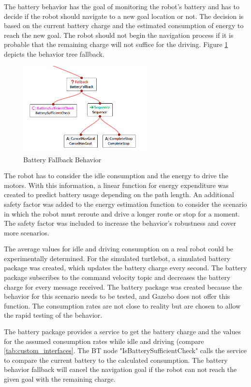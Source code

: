 The battery behavior has the goal of monitoring the robot's battery and has to decide if the robot should navigate to a new goal location or not. The decision is based on the current battery charge and the estimated consumption of energy to reach the new goal. The robot should not begin the navigation process if it is probable that the remaining charge will not suffice for the driving. Figure \ref{fig:battery_fallback} depicts the behavior tree fallback.

\begin{figure}[ht]
	\centering
	\includegraphics[width=0.6\textwidth]{images/battery_fallback_inverted.png}
	\caption{Battery Fallback Behavior}
	\label{fig:battery_fallback}
\end{figure}

The robot has to consider the idle consumption and the energy to drive the motors. With this information, a linear function for energy expenditure was created to predict battery usage depending on the path length. An additional safety factor was added to the energy estimation function to consider the scenario in which the robot must reroute and drive a longer route or stop for a moment. The safety factor was included to increase the behavior's robustness and cover more scenarios.
%

The average values for idle and driving consumption on a real robot could be experimentally determined. For the simulated turtlebot, a simulated battery package was created, which updates the battery charge every second. The battery package subscribes to the command velocity topic and decreases the battery charge for every message received. The battery package was created because the behavior for this scenario needs to be tested, and Gazebo does not offer this function. The consumption rates are not close to reality but are chosen to allow the rapid testing of the behavior.

The battery package provides a service to get the battery charge and the values for the assumed consumption rates while idle and driving (compare \ref{tab:custom_interfaces}. The BT node "IsBatterySufficientCheck" calls the service to compare the current battery to the calculated consumption. The battery behavior fallback will cancel the navigation goal if the robot can not reach the given goal with the remaining charge.

